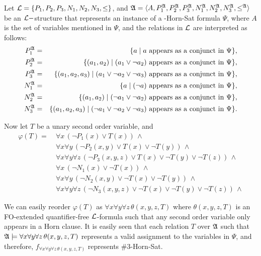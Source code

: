 Let ${\cal L} = \{P_1,P_2,P_3,N_1,N_2,N_3,\leq\}$, and ${\frak A} = \langle A, P_1^{\frak A},P_2^{\frak A},P_3^{\frak A},N_1^{\frak A},N_2^{\frak A},N_3^{\frak A}, \leq^{\frak A} \rangle$ be an ${\cal L}-$structure that represents an instance of a {-Horn-Sat} formula $\Psi$, where $A$ is the set of variables mentioned in $\Psi$, and the relations in ${\cal L}$ are interpreted as follows:
\begin{eqnarray*}
P_1^{\frak A} &=& \{a\mid a \mbox{ appears as a conjunct in }\Psi\},\\
P_2^{\frak A} &=& \{(a_1,a_2)\mid (a_1\vee \neg a_2) \mbox{ appears as a conjunct in }\Psi\},\\
P_3^{\frak A} &=& \{(a_1,a_2,a_3)\mid (a_1\vee \neg a_2\vee \neg a_3) \mbox{ appears as a conjunct in }\Psi\},\\
N_1^{\frak A} &=& \{a\mid (\neg a) \mbox{ appears as a conjunct in }\Psi\},\\
N_2^{\frak A} &=& \{(a_1,a_2)\mid (\neg a_1\vee \neg a_2) \mbox{ appears as a conjunct in }\Psi\},\\
N_3^{\frak A} &=& \{(a_1,a_2,a_3)\mid (\neg a_1\vee \neg a_2\vee \neg a_3) \mbox{ appears as a conjunct in }\Psi\}.
\end{eqnarray*}

Now let $T$ be a unary second order variable, and
\begin{align*}
\varphi(T) =\ &\forall x\, (\neg P_1(x) \vee T(x))\,\wedge\\
&\forall x\forall y\, (\neg P_2(x,y) \vee T(x) \vee \neg T(y))\,\wedge\\
&\forall x\forall y\forall z\, (\neg P_3(x,y,z) \vee T(x) \vee \neg T(y) \vee \neg T(z))\,\wedge\\
&\forall x\, (\neg N_1(x) \vee \neg T(x))\,\wedge\\
&\forall x\forall y\, (\neg N_2(x,y) \vee \neg T(x) \vee \neg T(y))\,\wedge\\
&\forall x\forall y\forall z\, (\neg N_3(x,y,z) \vee \neg T(x) \vee \neg T(y) \vee \neg T(z))\,\wedge
\end{align*}

We can easily reorder $\varphi(T)$ as $\forall x \forall y \forall z\,\theta(x,y,z,T)$ where $\theta(x,y,z,T)$ is an {\sc FO}-extended quantifier-free ${\cal L}$-formula such that any second order variable only appears in a Horn clause. It is easily seen that each relation $T$ over ${\frak A}$ such that ${\frak A}\models\forall x \forall y \forall z\,\theta(x,y,z,T)$ represents a valid assignment to the variables in $\Psi$, and therefore, $f_{\forall x \forall y \forall z\,\theta(x,y,z,T)}$ represents {\sc \#3-Horn-Sat}.

